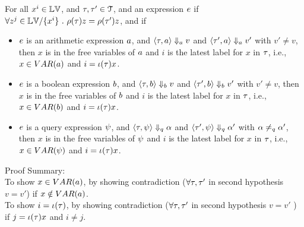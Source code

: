 \begin{lem}
	\label{lem:inv_expr}
	For all {$ x^i \in \mathbb{LV}$, and $\mathtt{\tau}, \mathtt{\tau}' \in \mathcal{T}$, and an expression $e$} if
	$ \forall z^j \in \mathbb{LV} / \{x^i\} ~.~ 
	\rho(\mathtt{\tau}) z = \rho(\mathtt{\tau}') z $, and if
	\begin{itemize}
		\item $e$ is an arithmetic expression $a$,
		and $\langle \mathtt{\tau}, a \rangle \Downarrow_a v $ and 
	$\langle \mathtt{\tau}', a \rangle \Downarrow_a v' $ with $v' \neq v$, 
	then $ x $ is in the free variables of $a$ and $i$ is the latest label for $x$ 
    in $\mathtt{\tau}$, i.e., $x \in VAR(a)$ and $i = \iota(\mathtt{\tau}) x$.
%
	\item $e$ is a boolean expression $b$,
  and $\langle \mathtt{\tau}, b \rangle \Downarrow_b v $ and 
 $\langle \mathtt{\tau}', b \rangle \Downarrow_b v' $ with $v' \neq v$, then $ x $ is in the free variables of $b$ and $i$ is the latest label for $x$ 
 in $\mathtt{\tau}$, i.e., $x \in VAR(b)$ and $i = \iota(\mathtt{\tau}) x$.
% 
	\item $e$ is a query expression $\psi$,
	and $\langle \mathtt{\tau}, \psi \rangle \Downarrow_q \alpha $ and 
	$\langle \mathtt{\tau}', \psi \rangle \Downarrow_q \alpha' $ with $\alpha \neq_{q} \alpha'$, then $ x $ is in the free variables of $\psi$ and $i$ is the latest label for $x$ 
    in $\mathtt{\tau}$, i.e., $x \in VAR(\psi)$ and $i = \iota(\mathtt{\tau}) x$.
\end{itemize}	%
	\end{lem}
    Proof Summary:
    \\
    To show $x \in VAR(a)$, by showing contradiction ($\forall \mathtt{\tau}, \mathtt{\tau}'$ in second hypothesis  $v = v'$)
     if $x \notin VAR(a)$.
     \\
    To show $i = \iota(\mathtt{\tau})$, by showing contradiction ($\forall \mathtt{\tau}, \mathtt{\tau}'$ in second hypothesis  $v = v'$ ) 
    if $j = \iota(\mathtt{\tau}) x$ and $i \neq j$.
